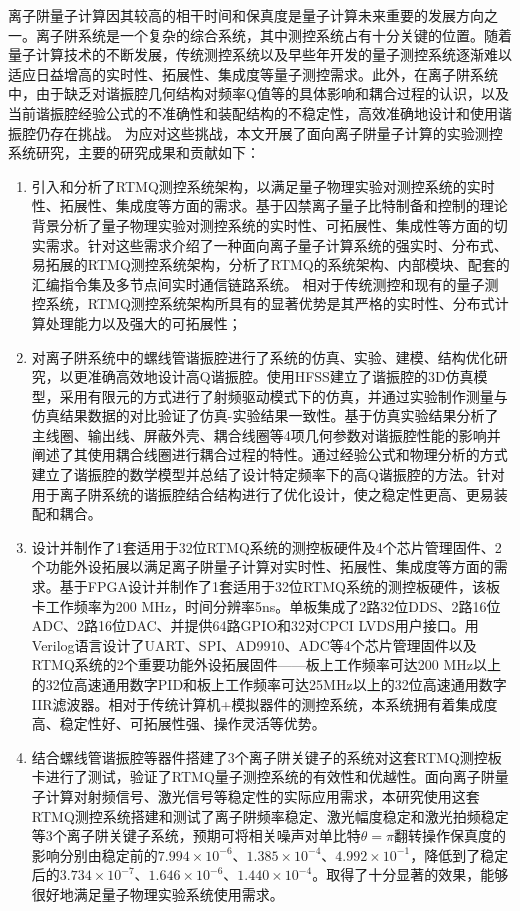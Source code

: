 
\begin{conclusion}

离子阱量子计算因其较高的相干时间和保真度是量子计算未来重要的发展方向之一。离子阱系统是一个复杂的综合系统，其中测控系统占有十分关键的位置。随着量子计算技术的不断发展，传统测控系统以及早些年开发的量子测控系统逐渐难以适应日益增高的实时性、拓展性、集成度等量子测控需求。此外，在离子阱系统中，由于缺乏对谐振腔几何结构对频率Q值等的具体影响和耦合过程的认识，以及当前谐振腔经验公式的不准确性和装配结构的不稳定性，高效准确地设计和使用谐振腔仍存在挑战。
为应对这些挑战，本文开展了面向离子阱量子计算的实验测控系统研究，主要的研究成果和贡献如下：
\begin{enumerate}
    \item 引入和分析了RTMQ测控系统架构，以满足量子物理实验对测控系统的实时性、拓展性、集成度等方面的需求。基于囚禁离子量子比特制备和控制的理论背景分析了量子物理实验对测控系统的实时性、可拓展性、集成性等方面的切实需求。针对这些需求介绍了一种面向离子量子计算系统的强实时、分布式、易拓展的RTMQ测控系统架构，分析了RTMQ的系统架构、内部模块、配套的汇编指令集及多节点间实时通信链路系统。
    相对于传统测控和现有的量子测控系统，RTMQ测控系统架构所具有的显著优势是其严格的实时性、分布式计算处理能力以及强大的可拓展性；
    \item 对离子阱系统中的螺线管谐振腔进行了系统的仿真、实验、建模、结构优化研究，以更准确高效地设计高Q谐振腔。使用HFSS建立了谐振腔的3D仿真模型，采用有限元的方式进行了射频驱动模式下的仿真，并通过实验制作测量与仿真结果数据的对比验证了仿真-实验结果一致性。基于仿真实验结果分析了主线圈、输出线、屏蔽外壳、耦合线圈等4项几何参数对谐振腔性能的影响并阐述了其使用耦合线圈进行耦合过程的特性。通过经验公式和物理分析的方式建立了谐振腔的数学模型并总结了设计特定频率下的高Q谐振腔的方法。针对用于离子阱系统的谐振腔结合结构进行了优化设计，使之稳定性更高、更易装配和耦合。
    \item 设计并制作了1套适用于32位RTMQ系统的测控板硬件及4个芯片管理固件、2个功能外设拓展以满足离子阱量子计算对实时性、拓展性、集成度等方面的需求。基于FPGA设计并制作了1套适用于32位RTMQ系统的测控板硬件，该板卡工作频率为200 MHz，时间分辨率5ns。单板集成了2路32位DDS、2路16位ADC、2路16位DAC、并提供64路GPIO和32对CPCI LVDS用户接口。用Verilog语言设计了UART、SPI、AD9910、ADC等4个芯片管理固件以及RTMQ系统的2个重要功能外设拓展固件——板上工作频率可达200 MHz以上的32位高速通用数字PID和板上工作频率可达25MHz以上的32位高速通用数字IIR滤波器。相对于传统计算机+模拟器件的测控系统，本系统拥有着集成度高、稳定性好、可拓展性强、操作灵活等优势。
    \item 结合螺线管谐振腔等器件搭建了3个离子阱关键子的系统对这套RTMQ测控板卡进行了测试，验证了RTMQ量子测控系统的有效性和优越性。面向离子阱量子计算对射频信号、激光信号等稳定性的实际应用需求，本研究使用这套RTMQ测控系统搭建和测试了离子阱频率稳定、激光幅度稳定和激光拍频稳定等3个离子阱关键子系统，预期可将相关噪声对单比特$\theta=\pi$翻转操作保真度的影响分别由稳定前的$7.994\times10^{-6}$、$1.385\times 10^{-4}$、$4.992\times 10^{-1}$，降低到了稳定后的$3.734\times10^{-7}$、$1.646\times 10^{-6}$、$1.440\times 10^{-4}$。取得了十分显著的效果，能够很好地满足量子物理实验系统使用需求。
  \end{enumerate}


\end{conclusion}
